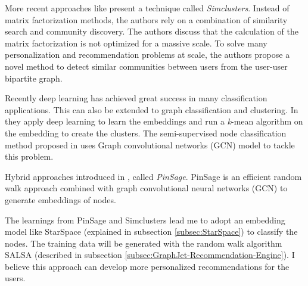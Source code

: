 More recent approaches like \cite{satuluriSimClustersCommunityBasedRepresentations2020a} present a technique called \emph{Simclusters}. Instead of matrix factorization methods, the authors rely on a combination of similarity search
and community discovery. The authors discuss that the calculation of the matrix factorization is not optimized for a massive scale. To solve many personalization and recommendation problems at scale, the authors propose a novel method to detect similar communities between users from the user-user bipartite graph.


Recently deep learning has achieved great success in many classification applications. This can also be extended to graph classification and clustering. In \cite{tianLearningDeepRepresentations2014} they apply deep learning to learn the embeddings and run a \emph{k}-mean algorithm on the embedding to create the clusters. The semi-supervised node classification method proposed in \cite{kipfSemiSupervisedClassificationGraph2017} uses Graph convolutional networks (GCN) model to tackle this problem. 

Hybrid approaches introduced in \cite{yingGraphConvolutionalNeural2018}, called \emph{PinSage}. PinSage is an efficient random walk approach combined with graph convolutional neural networks (GCN) to generate embeddings of nodes.


The learnings from PinSage and Simclusters lead me to adopt an embedding model like StarSpace (explained in subsection \ref{subsec:StarSpace}) to classify the nodes. The training data will be generated with the random walk algorithm SALSA (described in subsection \ref{subsec:GraphJet-Recommendation-Engine}). I believe this approach can develop more personalized recommendations for the users.
